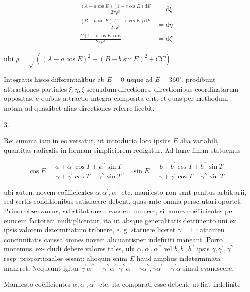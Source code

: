 \documentclass[10pt]{article}
\begin{document}
\[
\begin{aligned}
\frac{(A-a \cos E)(1-e \cos E) \mathrm{d} E}{2 \pi \rho^{3}} & =\mathrm{d} \xi \\
\frac{(B-h \sin E)(1-e \cos E) \mathrm{d} E}{2 \pi \rho^{3}} & =\mathrm{d} \eta \\
\frac{C(1-e \cos E) \mathrm{d} E}{2 \pi \rho^{3}} & =\mathrm{d} \zeta
\end{aligned}
\]

ubi \(\rho=\sqrt{ }\left((A-a \cos E)^{2}+(B-b \sin E)^{2}+C C\right)\).

Integratis hisce differentialibus ab \(E=0\) usque ad \(E=360^{\circ}\), prodibunt attractiones partiales \(\xi, \eta, \zeta\) secundum directiones, directionibus coordinatarum oppositas, e quibus attractio integra composita erit. et quas per methodum notam ad quaslibet alias directiones referre licebit.

3.

Rei summa iam in eo versatur, ut introducta loco ipsius \(E\) alia variabili, quantitas radicalis in formam simpliciorem redigatur. Ad hunc finem statuemus

\[
\cos E=\frac{a+\alpha^{\prime} \cos T+a^{\prime \prime} \sin T}{\gamma+\gamma^{\prime} \cos T+\gamma^{\prime \prime} \sin T}, \quad \sin E=\frac{b+b^{\prime} \cos T+b^{\prime \prime} \sin T}{\gamma+\gamma^{\prime} \cos T+\gamma^{\prime \prime} \sin T}
\]

ubi autem novem coëfficientes \(\alpha, \alpha^{\prime}, \alpha^{\prime \prime}\) etc. manifesto non sunt penitus arbitrarii, sed certis conditionibus satisfacere debent, quas ante omnia perscrutari oportet. Primo observamus, substitutionem eandem manere, si omnes coëfficientes per eundem factorem multiplicentur, ita ut absque generalitatis detrimento uni ex ipsis valorem determinatum tribuere, e. g. statuere liceret \(\gamma=1\) : attamen concinnitatis caussa omnes novem aliquantisper indefiniti maneant. Porro monemus, ex-
cludi debere valores tales, ubi \(\alpha, \alpha^{\prime}, \alpha^{\prime \prime}\) vel \(b, b^{\prime}, b^{\prime \prime}\) ipsis \(\gamma, \gamma^{\prime}, \gamma^{\prime \prime}\) resp. proportionales essent: alioquin enim \(E\) haud amplius indeterminata maneret. Nequeunt igitur \(\gamma^{\prime} \alpha^{\prime \prime}-\gamma^{\prime \prime} \alpha^{\prime}, \gamma^{\prime \prime} \alpha-\gamma \alpha^{\prime \prime}, \gamma \alpha^{\prime}-\gamma^{\prime} \alpha\) simul evanescere.

Manifesto coëfficientes \(\alpha, \alpha^{\prime}, \alpha^{\prime \prime}\) etc. ita comparati esse debent, ut fiat indefinite
\end{document}
